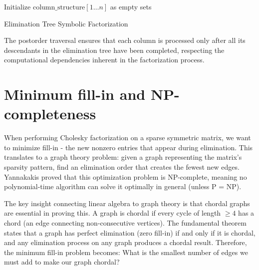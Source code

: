 \begin{algorithm}
\BlankLine
Initialize $\text{column\_structure}[1 \ldots n]$ as empty sets\;
\caption{Elimination Tree Symbolic Factorization}
\label{alg:symbolic_factorization}
\end{algorithm}

The postorder traversal ensures that each column is processed only after all its descendants in the elimination tree have been completed, respecting the computational dependencies inherent in the factorization process.


\section{Minimum fill-in and NP-completeness}

When performing Cholesky factorization on a sparse symmetric matrix, we want to minimize fill-in - the new nonzero entries that appear during elimination. This translates to a graph theory problem: given a graph representing the matrix's sparsity pattern, find an elimination order that creates the fewest new edges. Yannakakis \cite{yannakakis_computing_1981} proved that this optimization problem is NP-complete, meaning no polynomial-time algorithm can solve it optimally in general (unless P = NP).

The key insight connecting linear algebra to graph theory is that chordal graphs are essential in proving this. A graph is chordal if every cycle of length $\geq 4$ has a chord (an edge connecting non-consecutive vertices). The fundamental theorem states that a graph has perfect elimination (zero fill-in) if and only if it is chordal, and any elimination process on any graph produces a chordal result. Therefore, the minimum fill-in problem becomes: What is the smallest number of edges we must add to make our graph chordal?

